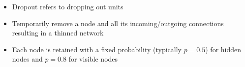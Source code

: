 \begin{frame}
{
	}
	\begin{itemize}
		\item Dropout refers to dropping out units
		\item<2-> Temporarily remove a node and all its incoming/outgoing connections resulting in a thinned network
		\item<3-> Each node is retained with a fixed probability (typically $p=0.5$) for hidden nodes and $p=0.8$ for visible nodes
	\end{itemize}				
\end{frame}
			
